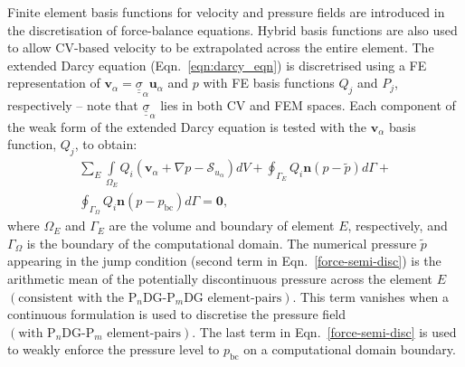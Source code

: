 \documentclass[preprint,authoryear,12pt]{elsarticle}
\newcommand{\PN}[2][error]{P$_{#1}$DG-P$_{#2}$}
\newcommand{\PNDG}[2][error]{P$_{#1}$DG-P$_{#2}$DG}
\begin{document}
\medskip
Finite element basis functions for velocity and pressure fields are introduced in the discretisation of force-balance equations. Hybrid basis functions are also used to allow CV-based velocity to be extrapolated across the entire element. The extended Darcy equation (Eqn.~\ref{eqn:darcy_eqn}) is discretrised using a FE representation of $\mathbf{v}_{\alpha}=\underline{\underline{\sigma}}_{\alpha}\mathbf{u}_{\alpha}$ and $p$ with FE basis functions $Q_{j}$ and $P_{j}$, respectively -- note that $\underline{\underline{\sigma}}_{\alpha}$ lies in both CV and FEM spaces. Each component of the weak form of the extended Darcy equation is tested with the $\mathbf{v}_\alpha$ basis function, $Q_{j}$, to obtain:
\begin{eqnarray}
  \sum\limits_{E} \left. \int\limits_{\Omega_E} { {Q}}_{i} \left({\mathbf v}_\alpha + \nabla p  - \mathcal{S}_{u_\alpha} \right) dV \right. + \displaystyle \oint_{\Gamma_{E}} {Q}_i {\mathbf n} \left(p - \tilde{p}\right) d\Gamma + \nonumber \\ 
  \oint_{\Gamma_{\Omega}} {Q}_i {\mathbf n} \left(p - p_\text{bc}\right) d\Gamma = \bm{0},
                   \label{force-semi-disc} 
\end{eqnarray} 
where $\Omega_E$ and $\Gamma_{E}$ are the volume and boundary of element $E$, respectively, and $\Gamma_{\Omega}$ is the boundary of the computational domain. The numerical pressure $\tilde{p}$ appearing in the jump condition (second term in Eqn.~\ref{force-semi-disc}) is the arithmetic mean of the potentially discontinuous pressure across the element $E$ $\left(\text{consistent with the \PNDG[n]{m} element-pairs}\right)$. This term vanishes when a continuous formulation is used to discretise the pressure field $\left(\text{with \PN[n]{m} element-pairs}\right)$. The last term in Eqn.~\ref{force-semi-disc} is used to weakly enforce the pressure level to $p_\text{bc}$ on a computational domain boundary.
\end{document}
